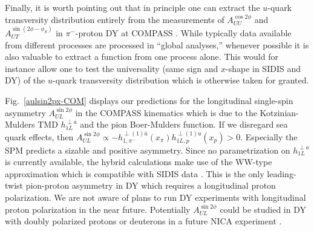 \documentclass[a4paper]{article}
\begin{document}
Finally,  it is worth pointing out that in principle one can extract the
$u$-quark transversity distribution entirely from the measurements 
of $A_{UU}^{\cos 2\phi}$ and $A_{UT}^{\sin(2\phi-\phi_S)}$ 
in $\pi^-$-proton DY at COMPASS \cite{Sissakian:2005yp}.
While typically data available from different processes are
processed in ``global analyses,'' whenever possible it is
also valuable to extract a function from one process alone.
This would for instance allow one to test the universality 
(same sign and $x$-shape in SIDIS and DY) of the $u$-quark 
transversity distribution which is otherwise taken for granted.

Fig.~\ref{aulsin2px-COM} displays our predictions for the
longitudinal single-spin asymmetry $A_{UL}^{\sin 2\phi}$ 
in the COMPASS kinematics which is due to the 
Kotzinian-Mulders TMD $h_{1L}^{\perp a}$ and the pion 
Boer-Mulders function. If we disregard sea quark effects, then 
$A_{UL}^{\sin 2\phi}\propto  -h_{1, \pi^-}^{\perp (1)\bar u }(x_\pi) h_{1L,p}^{\perp (1) u} (x_p) > 0$. Especially the SPM predicts
a sizable and positive asymmetry. Since no parametrization on
$h_{1L}^{\perp a}$ is currently available, the hybrid calculations 
make use of the WW-type approximation which is compatible with 
SIDIS data \cite{Bastami:2018xqd}.
This is the only leading-twist pion-proton asymmetry in DY
which requires a longitudinal proton polarization.
We are not aware of plans to run DY experiments with longitudinal 
proton polarization in the near future. Potentially $A_{UL}^{\sin2\phi}$ 
could be studied in DY with doubly polarized protons or deuterons in a 
future NICA experiment \cite{Savin:2015paa}.
\end{document}

